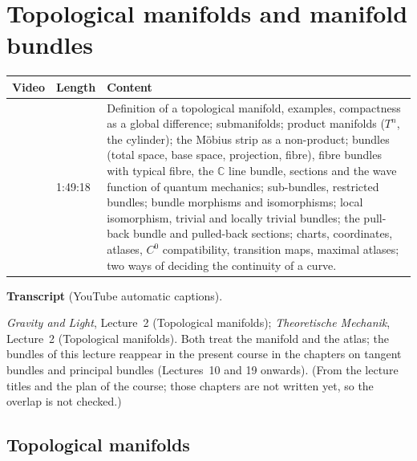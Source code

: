 \chapter{Topological manifolds and manifold bundles}\label{ch:l06}
\begin{paracol}{2}

\begin{sources}
\begin{tabularx}{\linewidth}{@{}l l L@{}}
\toprule
\textbf{Video} & \textbf{Length} & \textbf{Content}\\
\midrule
{} & 1:49:18 & Definition of a topological manifold,
examples, compactness as a global difference; submanifolds; product manifolds ($T^n$, the cylinder); the Möbius strip as a
non-product; bundles (total space, base space, projection, fibre), fibre bundles with typical fibre, the $\mathbb C$ line
bundle, sections and the wave function of quantum mechanics; sub-bundles, restricted bundles; bundle morphisms and isomorphisms;
local isomorphism, trivial and locally trivial bundles; the pull-back bundle and pulled-back sections; charts, coordinates,
atlases, $C^0$ compatibility, transition maps, maximal atlases; two ways of deciding the continuity of a curve.\\
\bottomrule
\end{tabularx}

\smallskip
\textbf{Transcript}  (YouTube automatic captions).
\end{sources}

\begin{reading}
\emph{Gravity and Light}, Lecture~2 (Topological manifolds); \emph{Theoretische Mechanik}, Lecture~2 (Topological
manifolds). Both treat the manifold and the atlas; the bundles of this lecture reappear in the present course in the chapters on tangent bundles and
principal bundles (Lectures~10 and 19 onwards). (From the lecture titles and the plan of the course; those chapters are not written
yet, so the overlap is not checked.)
\end{reading}

\section{Topological manifolds}\label{sec:mf-def}


\end{paracol}
